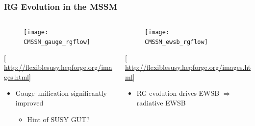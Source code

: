 \documentclass[10pt,aspectratio=169]{beamer}
\begin{document}
\begin{frame}
  \frametitle{RG Evolution in the MSSM}
  \begin{columns}[t]
    \begin{column}{0.5\textwidth}
      \begin{figure}
        \centering
        \texttt{[image: CMSSM\_gauge\_rgflow]}
      \end{figure}
      \vspace{-25pt}
      \begin{center}
        {\tiny [\href{http://flexiblesusy.hepforge.org/images.html}{%
              http://flexiblesusy.hepforge.org/images.html}]}
      \end{center}
      \begin{itemize}\itemsep1em
      \item Gauge unification significantly improved
        \begin{itemize}
          \item Hint of SUSY GUT?
        \end{itemize}
      \end{itemize}
    \end{column}
    \begin{column}{0.5\textwidth}
      \begin{figure}
        \centering
        \texttt{[image: CMSSM\_ewsb\_rgflow]}
      \end{figure}
      \vspace{-25pt}
      \begin{center}
        {\tiny [\href{http://flexiblesusy.hepforge.org/images.html}{%
              http://flexiblesusy.hepforge.org/images.html}]}
      \end{center}
      \begin{itemize}\itemsep1em
      \item RG evolution drives EWSB $\Rightarrow$ {\color{blue}
        radiative EWSB}
      \end{itemize}
    \end{column}
  \end{columns}
\end{frame}
\end{document}
